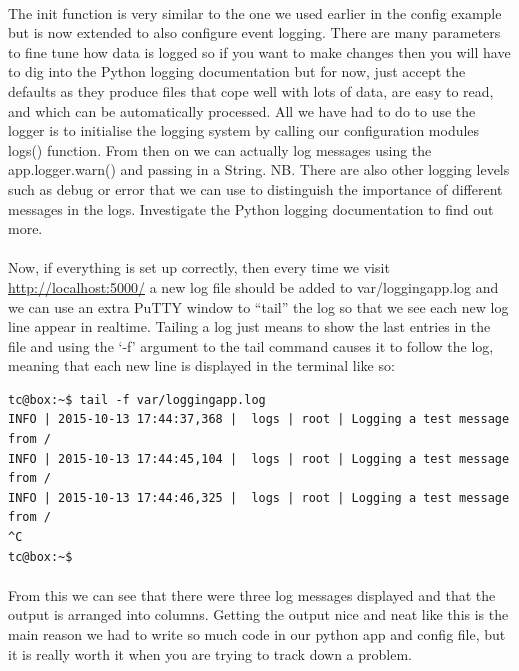 \documentclass[12pt, a4paper, twoside]{book}
\begin{document}
\paragraph{} The init function is very similar to the one we used earlier in the config example but is now extended to also configure event logging. There are many parameters to fine tune how data is logged so if you want to make changes then you will have to dig into the Python logging documentation but for now, just accept the defaults as they produce files that cope well with lots of data, are easy to read, and which can be automatically processed. All we have had to do to use the logger is to initialise the logging system by calling our configuration modules logs() function. From then on we can actually log messages using the app.logger.warn() and passing in a String. NB. There are also other logging levels such as debug or error that we can use to distinguish the importance of different messages in the logs. Investigate the Python logging documentation to find out more. 

\paragraph{} Now, if everything is set up correctly, then every time we visit \url{http://localhost:5000/} a new log file should be added to var/loggingapp.log and we can use an extra PuTTY window to ``tail'' the log so that we see each new log line appear in realtime. Tailing a log just means to show the last entries in the file and using the `-f' argument to the tail command causes it to follow the log, meaning that each new line is displayed in the terminal like so:

\begin{lstlisting}[style=DOS]
tc@box:~$ tail -f var/loggingapp.log 
INFO | 2015-10-13 17:44:37,368 |  logs | root | Logging a test message from /
INFO | 2015-10-13 17:44:45,104 |  logs | root | Logging a test message from /
INFO | 2015-10-13 17:44:46,325 |  logs | root | Logging a test message from /
^C
tc@box:~$ 
\end{lstlisting}

\paragraph{} From this we can see that there were three log messages displayed and that the output is arranged into columns. Getting the output nice and neat like this is the main reason we had to write so much code in our python app and config file, but it is really worth it when you are trying to track down a problem.
\end{document}
